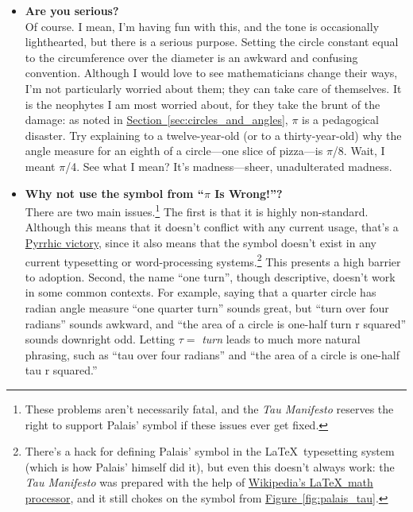 \documentclass{article}
\begin{document}
\begin{itemize}

  \item \textbf{Are you serious?} \\ Of course. I mean, I'm having fun with this, and the tone is occasionally lighthearted, but there is a serious purpose. Setting the circle constant equal to the circumference over the diameter is an awkward and confusing convention. Although I would love to see mathematicians change their ways, I'm not particularly worried about them; they can take care of themselves. It is the neophytes I am most worried about, for they take the brunt of the damage: as noted in \hyperref[sec:circles_and_angles]{Section~}\ref{sec:circles_and_angles}, $\pi$ is a pedagogical disaster. Try explaining to a twelve-year-old (or to a thirty-year-old) why the angle measure for an eighth of a circle---one slice of pizza---is $\pi$/8. Wait, I meant $\pi$/4. See what I mean? It's madness---sheer, unadulterated madness.

  \item \textbf{Why not use the symbol from ``$\pi$ Is Wrong!''?} \\ There are two main issues.\footnote{These problems aren't necessarily fatal, and the \emph{Tau Manifesto} reserves the right to support Palais' symbol if these issues ever get fixed.} The first is that it is highly non-standard. Although this means that it doesn't conflict with any current usage, that's a \href{http://en.wikipedia.org/wiki/Pyrrhic_victory}{Pyrrhic victory}, since it also means that the symbol doesn't exist in any current typesetting or word-processing systems.\footnote{There's a hack for defining Palais' symbol in the \LaTeX\ typesetting system (which is how Palais' himself did it), but even this doesn't always work: the \emph{Tau Manifesto} was prepared with the help of \href{http://en.wikipedia.org/wiki/Texvc}{Wikipedia's \LaTeX\ math processor}, and it still chokes on the symbol from \hyperref[fig:palais_tau]{Figure~}\ref{fig:palais_tau}.} This presents a high barrier to adoption. Second, the name ``one turn'', though descriptive, doesn't work in some common contexts. For example, saying that a quarter circle has radian angle measure ``one quarter turn'' sounds great, but ``turn over four radians'' sounds awkward, and ``the area of a circle is one-half turn r squared'' sounds downright odd. Letting $\tau = $ \emph{turn} leads to much more natural phrasing, such as ``tau over four radians'' and ``the area of a circle is one-half tau r squared.''


\end{itemize}
\end{document}
